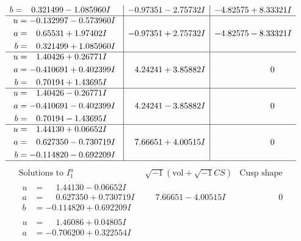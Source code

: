 \documentclass[1p]{elsarticle_modified}
\theoremstyle{definition}
\newcommand{\I}{\sqrt{-1}}
\begin{document}
$$\begin{array}{c|c|c}
\begin{aligned}
b &= \phantom{-}0.321499 - 1.085960 I\end{aligned}
 & -0.97351 - 2.75732 I & -4.82575 + 8.33321 I \\ \hline\begin{aligned}
u &= -0.132997 - 0.573960 I \\
a &= \phantom{-}0.65531 + 1.97402 I \\
b &= \phantom{-}0.321499 + 1.085960 I\end{aligned}
 & -0.97351 + 2.75732 I & -4.82575 - 8.33321 I \\ \hline\begin{aligned}
u &= \phantom{-}1.40426 + 0.26771 I \\
a &= -0.410691 + 0.402399 I \\
b &= \phantom{-}0.70194 + 1.43695 I\end{aligned}
 & \phantom{-}4.24241 + 3.85882 I & \phantom{-0.000000 } 0 \\ \hline\begin{aligned}
u &= \phantom{-}1.40426 - 0.26771 I \\
a &= -0.410691 - 0.402399 I \\
b &= \phantom{-}0.70194 - 1.43695 I\end{aligned}
 & \phantom{-}4.24241 - 3.85882 I & \phantom{-0.000000 } 0 \\ \hline\begin{aligned}
u &= \phantom{-}1.44130 + 0.06652 I \\
a &= \phantom{-}0.627350 - 0.730719 I \\
b &= -0.114820 - 0.692209 I\end{aligned}
 & \phantom{-}7.66651 + 4.00515 I & \phantom{-0.000000 } 0\\
 \hline 
 \end{array}$$\newpage$$\begin{array}{c|c|c}  
\text{Solutions to }I^u_{1}& \I (\text{vol} + \sqrt{-1}CS) & \text{Cusp shape}\\
 \hline 
\begin{aligned}
u &= \phantom{-}1.44130 - 0.06652 I \\
a &= \phantom{-}0.627350 + 0.730719 I \\
b &= -0.114820 + 0.692209 I\end{aligned}
 & \phantom{-}7.66651 - 4.00515 I & \phantom{-0.000000 } 0 \\ \hline\begin{aligned}
u &= \phantom{-}1.46086 + 0.04805 I \\
a &= -0.706200 + 0.322554 I \\

\end{aligned}
\end{array}$$
\end{document}
